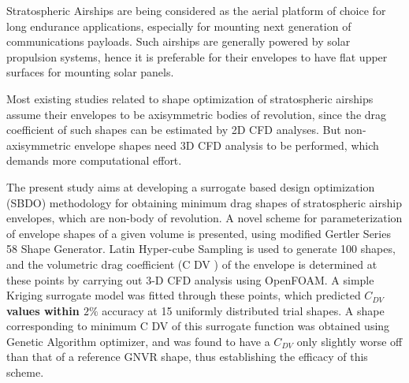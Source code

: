 \begin{Abstract}
Stratospheric Airships are being considered as the aerial platform of choice for long endurance applications, especially for mounting next generation of communications payloads. Such airships are generally powered by solar propulsion systems, hence it is preferable for their envelopes to have flat upper surfaces for mounting solar panels.   

Most existing studies related to shape optimization of stratospheric airships assume their envelopes to be axisymmetric bodies of revolution, since the drag coefficient of such shapes can be estimated by 2D CFD analyses. But non-axisymmetric envelope shapes need 3D CFD analysis to be performed, which demands more computational effort. 

The present study aims at developing a surrogate based design optimization (SBDO) methodology for obtaining minimum drag shapes of stratospheric airship envelopes, which are non-body of revolution. A novel scheme for parameterization of envelope shapes of a given volume is presented, using modified Gertler Series 58 Shape Generator. Latin Hyper-cube Sampling is used to generate 100 shapes, and the volumetric drag coefficient (C DV ) of the envelope is determined at these points by carrying out 3-D CFD analysis using OpenFOAM\textsuperscript{\textregistered}. A simple Kriging surrogate model was fitted through these points, which predicted  \textbf{$ C _{DV} $  values within $ 2 \% $} accuracy at 15 uniformly distributed trial shapes. A shape corresponding to minimum C DV of this surrogate function was obtained using Genetic Algorithm optimizer, and was found to have a $ C _{DV} $ only slightly worse off than that of a reference GNVR shape, thus establishing the efficacy of this scheme.
\end{Abstract}

